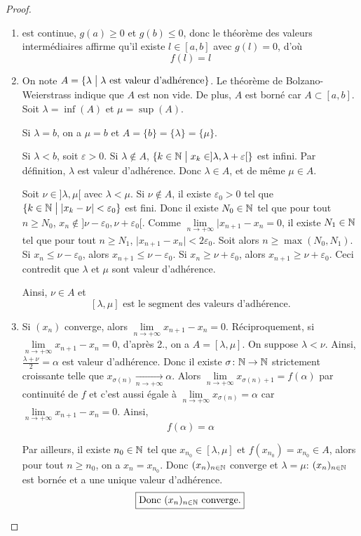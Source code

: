 \begin{proof}
	\phantom{}
	\begin{enumerate}
		\item {}
		est continue, $g(a)\geqslant0$ et $g(b)\leqslant0$, donc le théorème des valeurs intermédiaires affirme qu'il existe $l\in[a,b]$ avec $g(l)=0$, d'où 
		$$\boxed{f(l)=l}$$

		\item On note $A=\{\lambda\bigm| \lambda\text{ est valeur d'adhérence}\}$.
		Le théorème de Bolzano-Weierstrass indique que $A$ est non vide. De plus, $A$ est borné car $A\subset[a,b]$. Soit $\lambda=\inf(A)$ et $\mu=\sup(A)$. 
		
		Si $\lambda=b$, on a $\mu=b$ et $A=\{b\}=\{\lambda\}=\{\mu\}$.

		Si $\lambda<b$, soit $\varepsilon>0$. Si $\lambda\notin A$, $\{k\in\mathbb{N}\bigm| x_{k}\in]\lambda,\lambda+\varepsilon[\}$ est infini. Par définition, $\lambda$ est valeur d'adhérence. Donc $\lambda\in A$, et de même $\mu\in A$.

		Soit $\nu\in]\lambda,\mu[$ avec $\lambda<\mu$. Si $\nu\notin A$, il existe $\varepsilon_{0}>0$ tel que $\{k\in\mathbb{N}\bigm|\vert x_{k}-\nu\vert<\varepsilon_{0}\}$ est fini. Donc il existe $N_{0}\in\mathbb{N}$ tel que pour tout $n\geqslant N_{0}$, $x_{n}\notin]\nu-\varepsilon_{0},\nu+\varepsilon_{0}[$. Comme $\lim\limits_{n\to+\infty}\vert x_{n+1}-x_{n}=0$, il existe $N_{1}\in\mathbb{N}$ tel que pour tout $n\geqslant N_{1}$, $\vert x_{n+1}-x_{n}\vert<2\varepsilon_{0}$. 
		Soit alors $n\geqslant\max(N_{0},N_{1})$. Si $x_{n}\leqslant\nu-\varepsilon_{0}$, alors $x_{n+1}\leqslant\nu-\varepsilon_{0}$. Si $x_{n}\geqslant\nu+\varepsilon_{0}$, alors $x_{n+1}\geqslant\nu+\varepsilon_{0}$. Ceci contredit que $\lambda$ et $\mu$ sont valeur d'adhérence. 
		
		Ainsi, $\nu\in A$ et 
		$$\boxed{[\lambda,\mu] \text{ est le segment des valeurs d'adhérence.}}$$

		\item Si $(x_{n})$ converge, alors $\lim\limits_{n\to+\infty}x_{n+1}-x_{n}=0$. Réciproquement, si $\lim\limits_{n\to+\infty}x_{n+1}-x_{n}=0$, d'après 2., on a $A=[\lambda,\mu]$. On suppose $\lambda<\nu$. Ainsi, $\frac{\lambda+\nu}{2}=\alpha$ est valeur d'adhérence. Donc il existe $\sigma\colon\mathbb{N}\to\mathbb{N}$ strictement croissante telle que $x_{\sigma(n)}\xrightarrow[n\to+\infty]{}\alpha$. Alors $\lim\limits_{n\to+\infty}x_{\sigma(n)+1}=f(\alpha)$ par continuité de $f$ et c'est aussi égale à $\lim\limits_{n\to+\infty}x_{\sigma(n)}=\alpha$ car $\lim\limits_{n\to+\infty}x_{n+1}-x_{n}=0$.
		Ainsi, $$\boxed{f(\alpha)=\alpha}$$

		Par ailleurs, il existe $n_{0}\in\mathbb{N}$ tel que $x_{n_{0}}\in[\lambda,\mu]$ et $f(x_{n_{0}})=x_{n_{0}}\in A$, alors pour tout $n\geqslant n_{0}$, on a $x_{n}=x_{n_{0}}$. Donc $(x_{n})_{n\in\mathbb{N}}$ converge et $\lambda=\mu$: $(x_{n})_{n\in\mathbb{N}}$ est bornée et a une unique valeur d'adhérence. 
		$$\boxed{\text{Donc }(x_{n})_{n\in\mathbb{N}}\text{ converge.}}$$
	\end{enumerate}
\end{proof}

